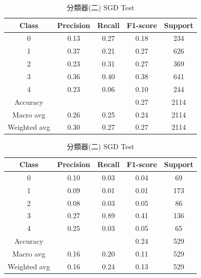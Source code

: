 \begin{enumerate}
\begin{enumerate}
                \begin{table}[H]
                \centering
                \scriptsize
                \begin{minipage}{0.48\textwidth}
                \centering
                \begin{tabular}{c|cccc}
                \hline
                Class & Precision & Recall & F1-score & Support \\
                \hline
                0 & 0.13 & 0.27 & 0.18 & 234 \\
                1 & 0.37 & 0.21 & 0.27 & 626 \\
                2 & 0.23 & 0.31 & 0.27 & 369 \\
                3 & 0.36 & 0.40 & 0.38 & 641 \\
                4 & 0.23 & 0.06 & 0.10 & 244 \\
                \hline
                Accuracy &       &       & 0.27 & 2114 \\
                Macro avg & 0.26 & 0.25 & 0.24 & 2114 \\
                Weighted avg & 0.30 & 0.27 & 0.27 & 2114 \\
                \hline
                \end{tabular}
                \caption{分類器(二) SGD Train}
                \label{tab:classifier_2_report_train_sgd_sgd_non_filtered}
                \end{minipage}%
                \hfill
                \begin{minipage}{0.48\textwidth}
                \centering
                \begin{tabular}{c|cccc}
                \hline
                Class & Precision & Recall & F1-score & Support \\
                \hline
                0 & 0.10 & 0.03 & 0.04 & 69 \\
                1 & 0.09 & 0.01 & 0.01 & 173 \\
                2 & 0.08 & 0.03 & 0.05 & 86 \\
                3 & 0.27 & 0.89 & 0.41 & 136 \\
                4 & 0.25 & 0.03 & 0.05 & 65 \\
                \hline
                Accuracy &       &       & 0.24 & 529 \\
                Macro avg & 0.16 & 0.20 & 0.11 & 529 \\
                Weighted avg & 0.16 & 0.24 & 0.13 & 529 \\
                \hline
                \end{tabular}
                \caption{分類器(二) SGD Test}
                \label{tab:classifier_2_report_test_sgd_sgd_non_filtered}
                \end{minipage}
                \end{table}



\end{enumerate}
\end{enumerate}
